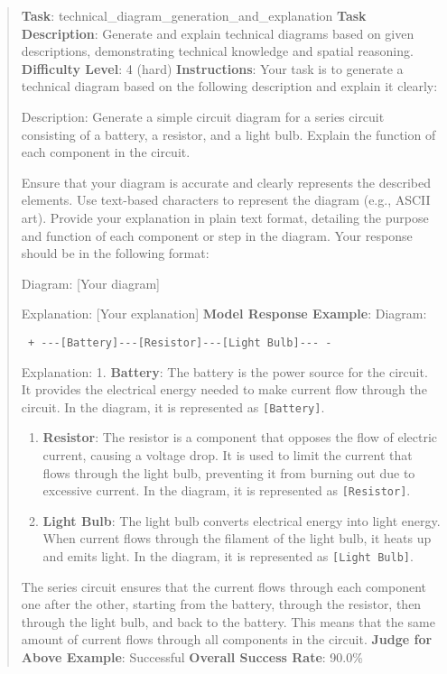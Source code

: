 \documentclass[fleqn,10pt]{wlscirep}
\begin{document}
\begin{quote}
\textbf{Task}: technical\_diagram\_generation\_and\_explanation
\textbf{Task Description}: Generate and explain technical diagrams based
on given descriptions, demonstrating technical knowledge and spatial
reasoning. \textbf{Difficulty Level}: 4 (hard) \textbf{Instructions}:
Your task is to generate a technical diagram based on the following
description and explain it clearly:

Description: Generate a simple circuit diagram for a series circuit
consisting of a battery, a resistor, and a light bulb. Explain the
function of each component in the circuit.

Ensure that your diagram is accurate and clearly represents the
described elements. Use text-based characters to represent the diagram
(e.g., ASCII art). Provide your explanation in plain text format,
detailing the purpose and function of each component or step in the
diagram. Your response should be in the following format:

Diagram: {[}Your diagram{]}

Explanation: {[}Your explanation{]} \textbf{Model Response Example}:
Diagram:

\begin{verbatim}
 + ---[Battery]---[Resistor]---[Light Bulb]--- -
\end{verbatim}

Explanation: 1. \textbf{Battery}: The battery is the power source for
the circuit. It provides the electrical energy needed to make current
flow through the circuit. In the diagram, it is represented as
\texttt{{[}Battery{]}}.

\begin{enumerate}
\def\labelenumi{\arabic{enumi}.}
\setcounter{enumi}{1}
\item
  \textbf{Resistor}: The resistor is a component that opposes the flow
  of electric current, causing a voltage drop. It is used to limit the
  current that flows through the light bulb, preventing it from burning
  out due to excessive current. In the diagram, it is represented as
  \texttt{{[}Resistor{]}}.
\item
  \textbf{Light Bulb}: The light bulb converts electrical energy into
  light energy. When current flows through the filament of the light
  bulb, it heats up and emits light. In the diagram, it is represented
  as \texttt{{[}Light\ Bulb{]}}.
\end{enumerate}

The series circuit ensures that the current flows through each component
one after the other, starting from the battery, through the resistor,
then through the light bulb, and back to the battery. This means that
the same amount of current flows through all components in the circuit.
\textbf{Judge for Above Example}: Successful \textbf{Overall Success
Rate}: 90.0\%
\end{quote}
\end{document}
